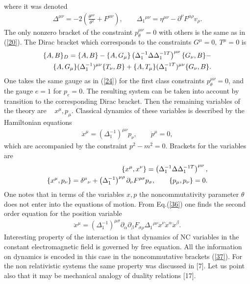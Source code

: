 \documentclass[paper a4]{article}
\begin{document}
where it was denoted
\begin{eqnarray}\label{34}
\Delta^{\mu\nu}=-2\left(\frac{\theta^{\mu\nu}}{\theta^2}+
F^{\mu\nu}\right), \qquad
\Delta_1{}^{\mu\nu}=\eta^{\mu\nu}-\partial^\nu F^{\mu\rho}v_\rho.
\end{eqnarray}
The only nonzero bracket of the constraint
$p_\theta^{\mu\nu}=0$ with others is the same as in (\ref{20}).
The Dirac bracket which corresponds to the constraints $G^\mu=0, ~
T^\mu=0$ is
\begin{eqnarray}\label{35}
\{A, B\}_D=\{A, B\}-\{A, G_\mu\}\left(\Delta_1^{-1}\Delta
\Delta_1^{-1{}T}\right)^{\mu\nu}\{G_\nu, B\}- \cr
\{A, G_\mu\}(\Delta_1^{-1})^{\mu\nu}\{T_\nu, B\}+\{A, T_\mu\}
(\Delta_1^{-1{}T})^{\mu\nu}\{G_\nu, B\}.
\end{eqnarray}
One takes the same gauge as in (\ref{24}) for the  first class
constraints $p_\theta^{\mu\nu}=0$, and the gauge $e=1$ for $p_e=0$.
The resulting system can be taken into account by transition to
the corresponding Dirac bracket. Then the remaining variables of the
theory are ~ $x^\mu, p_\mu$. Classical dynamics of these variables is
described by the Hamiltonian equations
\begin{eqnarray}\label{36}
\dot x^\mu=(\Delta_1^{-1})^{\mu\nu}p_\nu, \qquad \dot p^\mu=0,
\end{eqnarray}
which are accompanied by the constraint $p^2-m^2=0$. Brackets for the
variables are
\begin{eqnarray}\label{37}
\{x^\mu, x^\nu\}=\left(\Delta_1^{-1}\Delta
\Delta_1^{-1{}T}\right)^{\mu\nu}, \cr 
\{x^\mu, p_\nu\}=\delta^\mu{}_\nu+\left(\Delta_1^{-1}\right)^{\mu\rho}
\partial_\nu F^{\rho\sigma}p_\sigma, \qquad
\{p_\mu, p_\nu\}=0.
\end{eqnarray}
One notes that in terms of the variables $x, p$ the
noncommutativity parameter $\theta$ does not enter into the equations of
motion. From Eq.(\ref{36}) one finds the second order equation for the
position variable
\begin{eqnarray}\label{38}
\ddot x^\mu=(\Delta_1^{-1})^{\mu\sigma}\partial_\alpha\partial_\beta
F_{\sigma\rho}\Delta_1{}^{\rho\nu}\dot x^\nu\dot x^\alpha\dot x^\beta.
\end{eqnarray}
Interesting property of the interaction is that dynamics of NC variables
in the constant electromagnetic field is governed by free equation. All the
information on dynamics is encoded in this case in the noncommutative
brackets (\ref{37}). For the non relativistic systems the same property
was discussed in [7]. Let us point also that it may be mechanical analogy
of duality relations [17].
\end{document}
